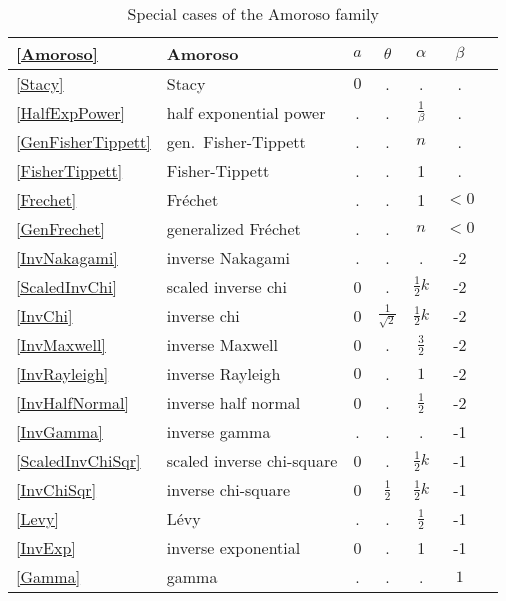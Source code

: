 \pagebreak[4]

\begin{table}[tp]
\begin{center}
\caption[Amoroso distribution -- Special cases]{Special cases of the Amoroso family}
\label{AmorosoTable}
~\\
{\renewcommand{\arraystretch}{1.2} 
\begin{tabular}{llccccl}
\eqref{Amoroso} & Amoroso & $a$ & $\theta$ & $\alpha$ & $\beta$  \\ 
\hline
\eqref{Stacy} & Stacy & $0$ & . & . & . \\
\eqref{HalfExpPower} & half exponential power & . & . & $\tfrac{1}{\beta}$ & . \\
\eqref{GenFisherTippett} & gen.\ Fisher-Tippett  & . & . & $n$ & .  \\
\eqref{FisherTippett} &  Fisher-Tippett & . & . & 1 & .  \\
\eqref{Frechet} &Fr\'{e}chet  & . & . & 1 &  $<\!\!0$  \\
\eqref{GenFrechet} &  generalized Fr\'{e}chet & . & . & $n$ & $<\!\!0$ \\
\eqref{InvNakagami} & inverse Nakagami & . & . & . & -2 \\
\eqref{ScaledInvChi} &scaled inverse chi& 0 & . & $\tfrac{1}{2}k$  & -2  \\
\eqref{InvChi} & inverse chi  & 0 & $\frac{1}{\sqrt{2}}$ & $\tfrac{1}{2}k$ & -2 \\
\eqref{InvMaxwell} & inverse Maxwell& 0 & . & $\frac{3}{2}$  & -2  \\
\eqref{InvRayleigh} &  inverse Rayleigh  & $0$ & . & $1$ & -2 \\
\eqref{InvHalfNormal} & inverse half normal & 0 & . & $\tfrac{1}{2}$ & -2 & \\  
\eqref{InvGamma} & inverse gamma & . & . & . & -1 \\
\eqref{ScaledInvChiSqr} & scaled inverse chi-square & 0 & . & $\tfrac{1}{2}k$ & -1 \\
\eqref{InvChiSqr} & inverse chi-square & 0 & $\frac{1}{2}$ & $\tfrac{1}{2}k$ & -1 \\
\eqref{Levy} & L\'{e}vy &  . & . & $\frac{1}{2}$ & -1 \\
\eqref{InvExp} &  inverse exponential & 0  & . & 1 & -1 \\
\eqref{Gamma} &gamma & . & . & . & $1$ \\

\end{tabular}}
\end{center}
\end{table}
